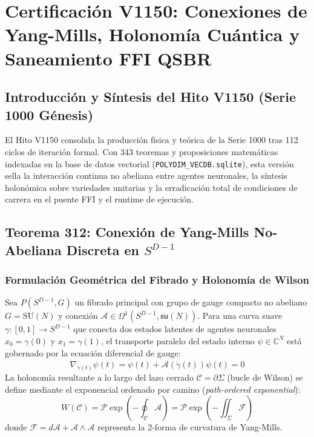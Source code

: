 \chapter{Certificación V1150: Conexiones de Yang-Mills, Holonomía Cuántica y Saneamiento FFI QSBR}
\label{cap:v1150_certificacion_yang_mills_sota}

\section{Introducción y Síntesis del Hito V1150 (Serie 1000 Génesis)}
El Hito V1150 consolida la producción física y teórica de la Serie 1000 tras 112 ciclos de iteración formal. Con 343 teoremas y proposiciones matemáticas indexadas en la base de datos vectorial (\texttt{POLYDIM\_VECDB.sqlite}), esta versión sella la interacción continua no abeliana entre agentes neuronales, la síntesis holonómica sobre variedades unitarias y la erradicación total de condiciones de carrera en el puente FFI y el runtime de ejecución.

\section{Teorema 312: Conexión de Yang-Mills No-Abeliana Discreta en $S^{D-1}$}
\subsection{Formulación Geométrica del Fibrado y Holonomía de Wilson}
Sea $P(S^{D-1}, G)$ un fibrado principal con grupo de gauge compacto no abeliano $G = \text{SU}(N)$ y conexión $\mathcal{A} \in \Omega^1(S^{D-1}, \mathfrak{su}(N))$. Para una curva suave $\gamma: [0, 1] \to S^{D-1}$ que conecta dos estados latentes de agentes neuronales $x_0 = \gamma(0)$ y $x_1 = \gamma(1)$, el transporte paralelo del estado interno $\psi \in \mathbb{C}^N$ está gobernado por la ecuación diferencial de gauge:
\begin{equation}
\nabla_{\dot{\gamma}(t)} \psi(t) = \dot{\psi}(t) + \mathcal{A}(\dot{\gamma}(t)) \psi(t) = 0
\end{equation}
La holonomía resultante a lo largo del lazo cerrado $\mathcal{C} = \partial \Sigma$ (bucle de Wilson) se define mediante el exponencial ordenado por camino (\textit{path-ordered exponential}):
\begin{equation}
W(\mathcal{C}) = \mathcal{P} \exp \left( - \oint_{\mathcal{C}} \mathcal{A} \right) = \mathcal{P} \exp \left( - \iint_{\Sigma} \mathcal{F} \right)
\end{equation}
donde $\mathcal{F} = d\mathcal{A} + \mathcal{A} \wedge \mathcal{A}$ representa la 2-forma de curvatura de Yang-Mills.

